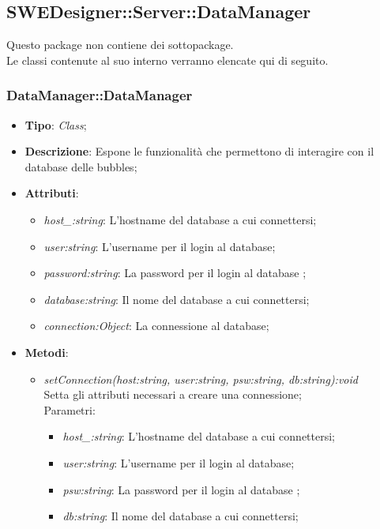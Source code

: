 \documentclass[../DefinizioneDiProdotto.tex]{subfiles}
\begin{document}
			
			\subsection{SWEDesigner::Server::DataManager}
			Questo package non contiene dei sottopackage.\\
			Le classi contenute al suo interno verranno elencate qui di seguito.
			\subsubsection{DataManager::DataManager}
			\hypertarget{SWEDesigner::Server::DataManager::DataManager}{}
			\begin{itemize}
				\item \textbf{Tipo}: \emph{Class};
				\item \textbf{Descrizione}: Espone le funzionalità che permettono di interagire con il database delle bubbles; \\
				\item \textbf{Attributi}:
				\begin{itemize}
					\item \emph{host\_:string}: L'hostname del database a cui connettersi;
					\item \emph{user:string}: L'username per il login al database;
					\item \emph{password:string}: La password per il login al database ;
					\item \emph{database:string}: Il nome del database a cui connettersi;
					\item \emph{connection:Object}: La connessione al database;
				\end{itemize}
				\item \textbf{Metodi}:
				\begin{itemize}
					\item \emph{setConnection(host:string, user:string, psw:string, db:string):void} \\ 
					Setta gli attributi necessari a creare una connessione; \\
					Parametri:
					\begin{itemize}
						\item \emph{host\_:string}: L'hostname del database a cui connettersi;
						\item \emph{user:string}: L'username per il login al database;
						\item \emph{psw:string}: La password per il login al database ;
						\item \emph{db:string}: Il nome del database a cui connettersi;
					\end{itemize}
					

\end{itemize}
\end{itemize}
\end{document}
